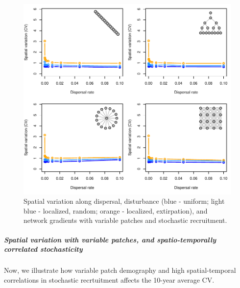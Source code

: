 \documentclass[]{article}
\let\oldsubparagraph\subparagraph
\renewcommand{\subparagraph}[1]{\oldsubparagraph{#1}\mbox{}}
\begin{document}
\begin{figure}[H]

{\centering \includegraphics{Managing_for_ecological_surprises_in_metapopulations_makeHTML_files/figure-latex/CV with variable patches and stochasticity-1} 

}

\caption{Spatial variation along dispersal, disturbance (blue - uniform; light blue - localized, random; orange - localized, extirpation), and network gradients with variable patches and stochastic recruitment.}\label{fig:CV with variable patches and stochasticity}
\end{figure}

\hypertarget{spatial-variation-with-variable-patches-and-spatio-temporally-correlated-stochasticity}{%
\subparagraph{Spatial variation with variable patches, and
spatio-temporally correlated
stochasticity}\label{spatial-variation-with-variable-patches-and-spatio-temporally-correlated-stochasticity}}

Now, we illustrate how variable patch demography and high
spatial-temporal correlations in stochastic recrtuitment affects the
10-year average CV.
\end{document}
